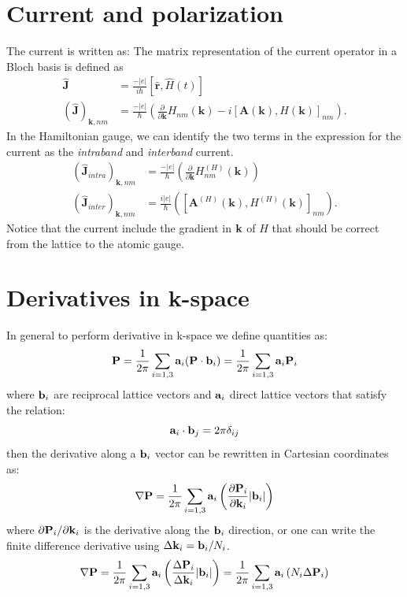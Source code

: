 \documentclass[preprint,showpacs,prb,superscriptaddress,aps,floatfix]{revtex4-1}
\newcommand{\ab}{{\bf a}}
\newcommand{\bb}{{\bf b}}
\newcommand{\PP}{{\bf P}}
\newcommand{\kk}{{\bf k}}
\newcommand{\be}{\begin{equation}}
\newcommand{\ee}{\end{equation}}
\renewcommand{\[}{\left[}
\renewcommand{\]}{\right]}
\renewcommand{\(}{\left(}
\renewcommand{\)}{\right)}
\begin{document}
\section{Current and polarization}	
The current is written as:
The matrix representation of the current operator in a Bloch basis
is defined as
\begin{align}
\hat{\boldsymbol{J}} & =\frac{-\left|e\right|}{i\hbar}\left[\hat{\boldsymbol{r}},\hat{H}\left(t\right)\right]\\
\left(\hat{\boldsymbol{J}}\right)_{\boldsymbol{k},nm} & =\frac{-\left|e\right|}{\hbar}\left(\frac{\partial}{\partial\boldsymbol{k}}H_{nm}\left(\boldsymbol{k}\right)-i\left[\boldsymbol{A}\left(\boldsymbol{k}\right),H\left(\boldsymbol{k}\right)\right]_{nm}\right).
\end{align}
In the Hamiltonian gauge, we can identify the two terms in the expression
for the current as the \emph{intraband }and \emph{interband }current.
\begin{align}
\left(\hat{\boldsymbol{J}}_{intra}\right)_{\boldsymbol{k},nm} & =\frac{-\left|e\right|}{\hbar}\left(\frac{\partial}{\partial\boldsymbol{k}}H_{nm}^{\left(H\right)}\left(\boldsymbol{k}\right)\right)\\
\left(\hat{\boldsymbol{J}}_{inter}\right)_{\boldsymbol{k},nm} & =\frac{i\left|e\right|}{\hbar}\left(\left[\boldsymbol{A}^{\left(H\right)}\left(\boldsymbol{k}\right),H^{\left(H\right)}\left(\boldsymbol{k}\right)\right]_{nm}\right).
\end{align}
Notice that the current include the gradient in $\kk$ of $H$ that should be correct from the lattice to the atomic gauge.

\appendix
\section{Derivatives in k-space}
In general to perform derivative in k-space we define quantities as:
\be
\PP = \frac{1}{2\pi} \sum_{i=1,3} \ab_i (\PP \cdot \bb_i) = \frac{1}{2\pi} \sum_{i=1,3} \ab_i \PP_i
\ee
where $\bb_i$ are reciprocal lattice vectors and $\ab_i$ direct lattice vectors that satisfy the relation:
\be
\ab_i \cdot \bb_j = 2\pi\delta_{ij}
\ee
then the derivative along a $\bb_i$ vector can be rewritten in Cartesian coordinates as:
\be
\nabla \PP = \frac{1}{2\pi} \sum_{i=1,3} \ab_i \left( \frac{\partial \PP_i}{\partial \kk_i} |\bb_i| \right)
\ee 
where $\partial \PP_i/\partial \kk_i$ is the derivative along the $\bb_i$ direction, or one can write the finite difference derivative using $\Delta \kk_i = \bb_i/N_i$.
\be
\nabla \PP = \frac{1}{2\pi} \sum_{i=1,3} \ab_i \left( \frac{\Delta \PP_i}{\Delta \kk_i}  |\bb_i|  \right) = \frac{1}{2\pi} \sum_{i=1,3} \ab_i \left( N_i \Delta \PP_i \right)
\ee 



\end{document}
